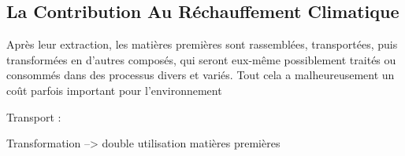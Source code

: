 
\subsection{La Contribution Au Réchauffement Climatique}


Après leur extraction, les matières premières sont rassemblées, transportées, puis transformées en d'autres composés, qui seront eux-même possiblement traités ou consommés dans des processus divers et variés. Tout cela a malheureusement un coût parfois important pour l'environnement

\medbreak 



Transport : 


Transformation
--> double utilisation matières premières


